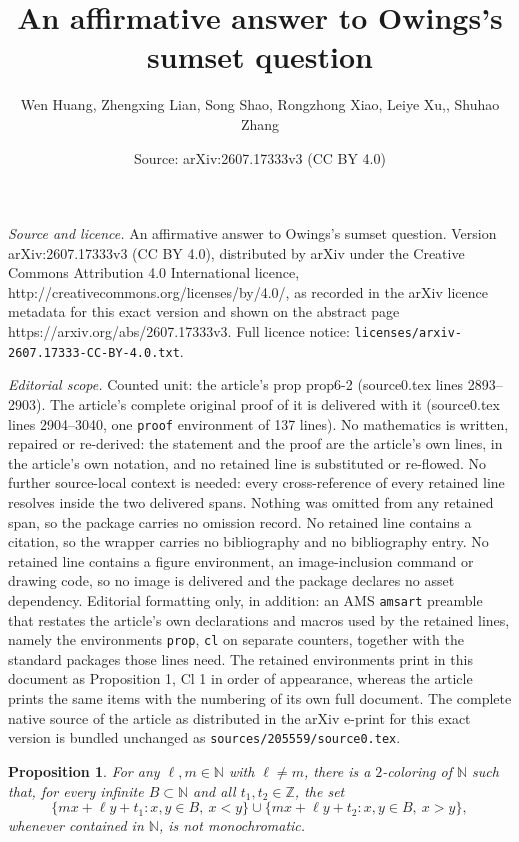 \documentclass[10pt,a4paper]{amsart}
\title{An affirmative answer to Owings's sumset question}
\author{Wen Huang, Zhengxing Lian, Song Shao, Rongzhong Xiao, Leiye Xu,, Shuhao Zhang}
\date{Source: arXiv:2607.17333v3 (CC BY 4.0)}
\newtheorem{prop}{Proposition}
\def \N {\mathbb N}
\begin{document}
\maketitle

\noindent\emph{Source and licence.} An affirmative answer to Owings's sumset question. Version arXiv:2607.17333v3 (CC BY 4.0), distributed by arXiv under the Creative Commons Attribution 4.0 International licence, http://creativecommons.org/licenses/by/4.0/, as recorded in the arXiv licence metadata for this exact version and shown on the abstract page https://arxiv.org/abs/2607.17333v3. Full licence notice: \texttt{licenses/arxiv-2607.17333-CC-BY-4.0.txt}.\par\smallskip

\noindent\textit{Editorial scope.} Counted unit: the article's prop prop6-2 (source0.tex lines 2893--2903). The article's complete original proof of it is delivered with it (source0.tex lines 2904--3040, one \texttt{proof} environment of 137 lines). No mathematics is written, repaired or re-derived: the statement and the proof are the article's own lines, in the article's own notation, and no retained line is substituted or re-flowed.  No further source-local context is needed: every cross-reference of every retained line resolves inside the two delivered spans.  Nothing was omitted from any retained span, so the package carries no omission record.  No retained line contains a citation, so the wrapper carries no bibliography and no bibliography entry.  No retained line contains a figure environment, an image-inclusion command or drawing code, so no image is delivered and the package declares no asset dependency.  Editorial formatting only, in addition: an AMS \texttt{amsart} preamble that restates the article's own declarations and macros used by the retained lines, namely the environments \texttt{prop}, \texttt{cl} on separate counters, together with the standard packages those lines need.  The retained environments print in this document as Proposition 1, Cl 1 in order of appearance, whereas the article prints the same items with the numbering of its own full document.  The complete native source of the article as distributed in the arXiv e-print for this exact version is bundled unchanged as \texttt{sources/205559/source0.tex}.
\begin{prop}\label{prop6-2}
For any $\ell,m\in \N$ with $\ell\neq m$, there is a $2$-coloring of
$\N$ such that, for every infinite $B\subset\N$ and all
$t_1,t_2\in\mathbb Z$, the set
\[
\{mx+\ell y+t_1:x,y\in B,\ x<y\}
\cup
\{mx+\ell y+t_2:x,y\in B,\ x>y\},
\]
whenever contained in $\N$, is not monochromatic.
\end{prop}
\end{document}
